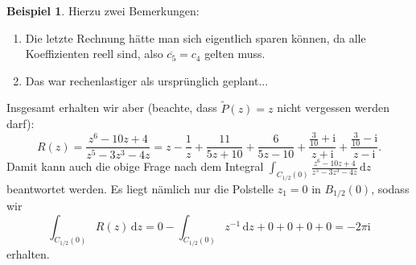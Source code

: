 \documentclass{article}
\theoremstyle{plain}
\theoremstyle{definition}
\newtheorem{example}{Beispiel}
\newcommand{\iu}{\mathrm{i}}
\begin{document}
\begin{example}
	Hierzu zwei Bemerkungen:
	\begin{enumerate}
		\item Die letzte Rechnung hätte man sich eigentlich sparen können, da alle Koeffizienten reell sind, also $\overline{c_5} = c_4$ gelten muss.
		\item Das war rechenlastiger als ursprünglich geplant... \faGrinBeamSweat[regular]
	\end{enumerate}
	Insgesamt erhalten wir aber (beachte, dass $\tilde{P}(z) = z$ nicht vergessen werden darf):
	\[
		R(z) = \frac{z^6-10z+4}{z^5 - 3 z^3 - 4 z} = z - \frac{1}{z} + \frac{11}{5z + 10} + \frac{6}{5z - 10} + \frac{\frac{3}{10} + \iu}{z + \iu} + \frac{\frac{3}{10} - \iu}{z - \iu}.
	\]
	Damit kann auch die obige Frage nach dem Integral $\int_{C_{1/2}(0)} \frac{z^6-10z+4}{z^5 - 3 z^3 - 4 z} \,\mathrm{d}z$ beantwortet werden.
	Es liegt nämlich nur die Polstelle $z_1 = 0$ in $B_{1/2}(0)$, sodass wir
	\[
		\int_{C_{1/2}(0)} R(z) \,\mathrm{d}z = 0 - \int_{C_{1/2}(0)} z^{-1} \,\mathrm{d}z + 0 + 0 + 0 + 0 = -2 \pi \mathrm{i}
	\]
	erhalten.
\end{example}
\end{document}
